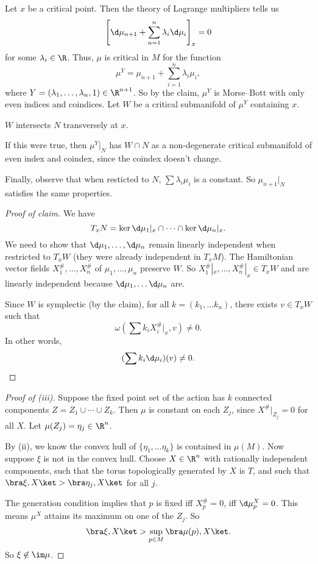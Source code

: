 \documentclass[a4paper]{article}
\begin{document}
Let $x$ be a critical point. Then the theory of Lagrange multipliers tells us
\[
  \left[\d \mu_{n + 1} + \sum_{n = 1}^n \lambda_i \d \mu_i\right]_x = 0
\]
for some $\lambda_i \in \R$. Thus, $\mu$ is critical in $M$ for the function
\[
  \mu^Y = \mu_{n + 1} + \sum_{i = 1}^n \lambda_i \mu_i,
\]
where $Y = (\lambda_1, \ldots, \lambda_n, 1) \in \R^{n + 1}$. So by the claim, $\mu^Y$ is Morse--Bott with only even indices and coindices. Let $W$ be a critical submanifold of $\mu^Y$ containing $x$.
\begin{claim}
  $W$ intersects $N$ transversely at $x$.
\end{claim}
If this were true, then $\mu^Y|_N$ has $W \cap N$ as a non-degenerate critical submanifold of even index and coindex, since the coindex doesn't change. %

Finally, observe that when resticted to $N$, $\sum \lambda_i \mu_i$ is a constant. So $\mu_{n + 1}|_N$ satisfies the same properties.

\begin{proof}[Proof of claim]
  We have
  \[
    T_x N = \ker \d \mu_1|_x \cap \cdots \cap \ker \d \mu_n|_x.
  \]
  We need to show that $\d \mu_1, \ldots, \d \mu_n$ remain linearly independent when restricted to $T_x W$ (they were already independent in $T_x M$). The Hamiltonian vector fields $X_1^\#, \ldots, X_n^\#$ of $\mu_1, \ldots, \mu_n$ preserve $W$. So $X_1^\#|_x, \ldots, X^\#_n|_x \in T_x W$ and are linearly independent because $\d \mu_1, \ldots \d \mu_n$ are.

  Since $W$ is symplectic (by the claim), for all $k = (k_1, \ldots k_n)$, there exists $v \in T_x W$ such that
  \[
    \omega \left(\sum k_i X_i^\#|_x, v\right) \not= 0.
  \]
  In other words,
  \[
    (\sum k_i \d \mu_i)(v) \not= 0.\qedhere
  \]
\end{proof}

\begin{proof}[Proof of (iii)]
  Suppose the fixed point set of the action has $k$ connected components $Z = Z_1 \cup \cdots \cup Z_k$. Then $\mu$ is constant on each $Z_j$, since $X^\#|_{Z_j} = 0$ for all $X$. Let $\mu(Z_j) = \eta_j \in \R^n$.

  By (ii), we know the convex hull of $\{\eta_1, \ldots \eta_k\}$ is contained in $\mu(M)$. Now suppose $\xi$ is not in the convex hull. Choose $X \in \R^n$ with rationally independent components, such that the torus topologically generated by $X$ is $T$, and such that $\bra \xi, X\ket > \bra \eta_j, X\ket$ for all $j$.

  The generation condition implies that $p$ is fixed iff $X_p^\# = 0$, iff $\d \mu_p^X = 0$. This means $\mu^X$ attains its maximum on one of the $Z_j$. So
  \[
    \bra \xi, X\ket > \sup_{p \in M} \bra \mu(p), X\ket.
  \]
  So $\xi \not \in \im \mu$.
\end{proof}
\end{document}
